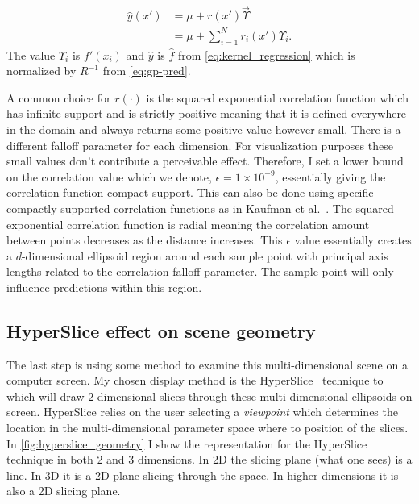 \begin{align*}
  \hat{y}(x') &= \mu + r(x') \vec{\Upsilon} \\
              &= \mu + \sum_{i=1}^N r_i(x') \Upsilon_i \text{.}
\end{align*}
The value $\Upsilon_i$ is $f'(x_i)$ and $\hat{y}$ is $\hat{f}$ from 
\autoref{eq:kernel_regression} which is normalized by $R^{-1}$ from 
\autoref{eq:gp-pred}.

A common choice for $r(\cdot)$ is the squared exponential correlation
function
which has infinite support and is strictly 
positive meaning that it is defined everywhere in the domain and always 
returns some positive value however small. 
There is a different falloff
parameter for each dimension.
For visualization purposes these small values don't contribute a
perceivable effect.
Therefore, I set a lower bound on the correlation value which we denote,
$\epsilon = 1 \times 10^{-9}$, essentially giving the correlation function
compact support. This can also be done using specific compactly supported 
correlation functions as in
Kaufman et al.~\cite{Kaufman:2011}. 
The squared exponential correlation function is radial meaning the
correlation amount between points decreases as the distance increases.
This $\epsilon$ value essentially creates a $d$-dimensional ellipsoid region
around each sample point with principal axis lengths related to the 
correlation falloff parameter. The sample point will only influence 
predictions within this region.

\subsection{HyperSlice effect on scene geometry}
\label{sec:hypersliceeffectonscenegeometry}

The last step is using some method to examine this multi-dimensional
scene on a computer screen. My
chosen display method is the
HyperSlice~\cite{Wijk:1993} technique to which will draw $2$-dimensional
slices through these multi-dimensional ellipsoids on screen.  
HyperSlice relies on the user selecting a \textit{viewpoint} which 
determines the location in the multi-dimensional parameter space where to
position of the slices.
In \autoref{fig:hyperslice_geometry} I show the representation for the
HyperSlice technique in both 2 and 3 dimensions.  In 2D the slicing plane (what
one sees) is a line.  In 3D it is a 2D plane slicing through the space.  In 
higher dimensions it is also a 2D slicing plane.

